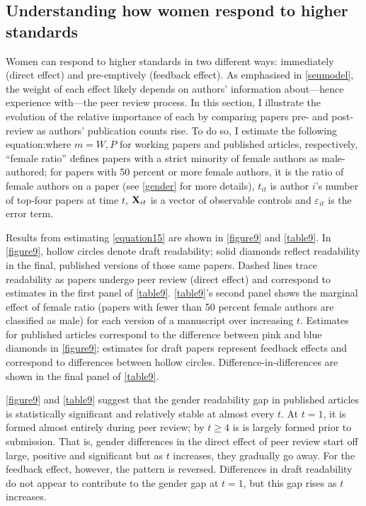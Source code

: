 

\subsection{Understanding how women respond to higher standards}
\label{indirecteffect}

Women can respond to higher standards in two different ways: immediately (direct effect) and pre-emptively (feedback effect). As emphasised in \autoref{seumodel}, the weight of each effect likely depends on authors' information about---hence experience with---the peer review process. In this section, I illustrate the evolution of the relative importance of each by comparing papers pre- and post-review as authors' publication counts rise. To do so, I estimate the following equation:where $m=W,P$ for working papers and published articles, respectively, ``female ratio'' defines papers with a strict minority of female authors as male-authored; for papers with 50 percent or more female authors, it is the ratio of female authors on a paper (see \autoref{gender} for more details), $t_{it}$ is author $i$'s number of top-four papers at time $t$, $\mathbf{X}_{it}$ is a vector of observable controls and $\varepsilon_{it}$ is the error term. 

Results from estimating \autoref{equation15} are shown in \autoref{figure9} and \autoref{table9}. In \autoref{figure9}, hollow circles denote draft readability; solid diamonds reflect readability in the final, published versions of those same papers. Dashed lines trace readability as papers undergo peer review (direct effect) and correspond to estimates in the first panel of \autoref{table9}. \autoref{table9}'s second panel shows the marginal effect of female ratio (papers with fewer than 50 percent female authors are classified as male) for each version of a manuscript over increasing $t$. Estimates for published articles correspond to the difference between pink and blue diamonds in \autoref{figure9}; estimates for draft papers represent feedback effects and correspond to differences between hollow circles. Difference-in-differences are shown in the final panel of \autoref{table9}.



\autoref{figure9} and \autoref{table9} suggest that the gender readability gap in published articles is statistically significant and relatively stable at almost every $t$. At $t=1$, it is formed almost entirely during peer review; by $t\ge4$ is is largely formed prior to submission. That is, gender differences in the direct effect of peer review start off large, positive and significant but as $t$ increases, they gradually go away. For the feedback effect, however, the pattern is reversed. Differences in draft readability do not appear to contribute to the gender gap at $t=1$, but this gap rises as $t$ increases.

